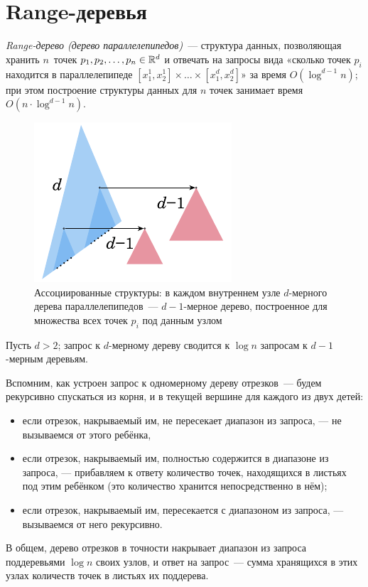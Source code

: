 \documentclass[a4paper,11pt]{article}
\begin{document}
\section{\bf Range-деревья}

\emph{Range-дерево (дерево параллелепипедов)}~— структура данных, позволяющая
хранить \(n\)~то\-чек \(p_1, p_2, \ldots, p_n \in \mathbb R^d\) и отвечать на
запросы вида «сколько точек \(p_i\) находится в параллелепипеде
\([x^1_1, x^1_2] \times \ldots \times [x^d_1, x^d_2]\)»
за время \(O (\log^{d-1} n)\); при этом построение структуры данных
для \(n\) точек занимает время \(O (n \cdot \log^{d-1} n)\).


\begin{figure}[h] \centering
  \includegraphics{img/range-tree}
  \caption{Ассоциированные структуры: в каждом внутреннем узле
    \(d\)-мерного дерева параллелепипедов~— \(d-1\)-мерное
    дерево, построенное для множества всех точек \(p_i\) под данным узлом}
  \label{fig:range-tree}
\end{figure}


\begin{theorem}
  Пусть \(d > 2\); запрос к \(d\)-мерному дереву сводится к
  \(\log n\) запросам к \(d-1\)-мерным деревьям.
\end{theorem}

Вспомним, как устроен запрос к одномерному дереву отрезков~— будем
рекурсивно спускаться из корня, и в текущей вершине для каждого из двух детей:
\begin{itemize}
  \item если отрезок, накрываемый им, не пересекает диапазон
    из запроса, — не вызываемся от этого ребёнка,
  \item если отрезок, накрываемый им, полностью содержится в диапазоне
    из запроса, — прибавляем к ответу количество точек, находящихся
    в листьях под этим ребёнком (это количество хранится
    непосредственно в нём);
  \item если отрезок, накрываемый им, пересекается с диапазоном
    из запроса, — вызываемся от него рекурсивно.
\end{itemize}

В общем, дерево отрезков в точности накрывает диапазон из запроса
поддеревьями \(\log n\) своих узлов, и ответ на запрос~— сумма
хранящихся в этих узлах количеств точек в листьях их поддерева.
\end{document}
